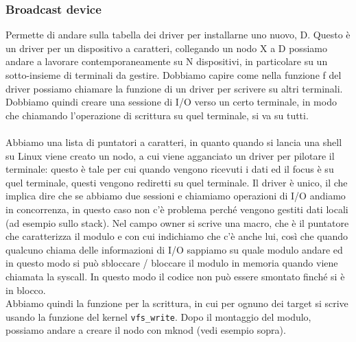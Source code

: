 \documentclass[12pt, oneside]{extbook}
\begin{document}
\subsubsection*{Broadcast device}
Permette di andare sulla tabella dei driver per installarne uno nuovo, D. Questo è un driver per un dispositivo a caratteri, collegando un nodo X a D possiamo andare a lavorare contemporaneamente su N dispositivi, in particolare su un sotto-insieme di terminali da gestire. Dobbiamo capire come nella funzione f del driver possiamo chiamare la funzione di un driver per scrivere su altri terminali. Dobbiamo quindi creare una sessione di I/O verso un certo terminale, in modo che chiamando l'operazione di scrittura su quel terminale, si va su tutti.\\\\Abbiamo una lista di puntatori a caratteri, in quanto quando si lancia una shell su Linux viene creato un nodo, a cui viene agganciato un driver per pilotare il terminale: questo è tale per cui quando vengono ricevuti i dati ed il focus è su quel terminale, questi vengono rediretti su quel terminale. Il driver è unico, il che implica dire che se abbiamo due sessioni e chiamiamo operazioni di I/O andiamo in concorrenza, in questo caso non c'è problema perché vengono gestiti dati locali (ad esempio sullo stack). Nel campo owner si scrive una macro, che è il puntatore che caratterizza il modulo e con cui indichiamo che c'è anche lui, così che quando qualcuno chiama delle informazioni di I/O sappiamo su quale modulo andare ed in questo modo si può sbloccare / bloccare il modulo in memoria quando viene chiamata la syscall. In questo modo il codice non può essere smontato finché si è in blocco.\\Abbiamo quindi la funzione per la scrittura, in cui per ognuno dei target si scrive usando la funzione del kernel \texttt{vfs\_write}. Dopo il montaggio del modulo, possiamo andare a creare il nodo con mknod (vedi esempio sopra).
\end{document}
